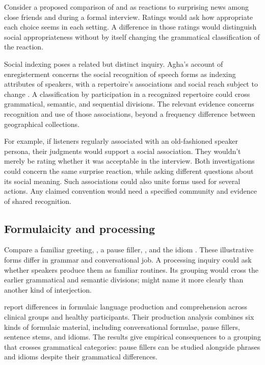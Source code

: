 \documentclass[12pt]{article}
\begin{document}
Consider a proposed comparison of  and 
as reactions to surprising news among close friends and during a
formal interview. Ratings would ask how appropriate each choice seems
in each setting. A difference in those ratings would distinguish
social appropriateness without by itself changing the grammatical classification
of the reaction.

Social indexing poses a related but distinct inquiry. Agha's account
of enregisterment concerns the social recognition of speech forms as
indexing attributes of speakers, with a repertoire's associations and
social reach subject to change \citep[38--40]{agha2005}. A classification
by participation in a recognized repertoire could cross grammatical,
semantic, and sequential divisions. The relevant evidence concerns
recognition and use of those associations, beyond a frequency difference
between geographical collections.

For example, if listeners regularly associated  with an
old-fashioned speaker persona, their judgments would support a social
association. They wouldn't merely be rating whether it was acceptable
in the interview. Both investigations could concern the same surprise
reaction, while asking different questions about its social meaning.
Such associations could also unite forms used for several actions.
Any claimed convention would need a specified community and evidence
of shared recognition.

\subsection{Formulaicity and processing}

Compare a familiar greeting, , a pause filler,
, and the idiom . These illustrative
forms differ in grammar and conversational job. A processing inquiry
could ask whether speakers produce them as familiar routines.
Its grouping would cross the earlier grammatical and semantic divisions;
 might name it more clearly than another
kind of interjection.

\textcite{vanlanckersidtis2015} report differences in formulaic
language production and comprehension across clinical groups and
healthy participants. Their production
analysis combines six kinds of formulaic material, including conversational
formulae, pause fillers, sentence stems, and idioms. The results give
empirical consequences to a grouping that crosses grammatical categories:
pause fillers can be studied alongside phrases and idioms despite
their grammatical differences.
\end{document}
